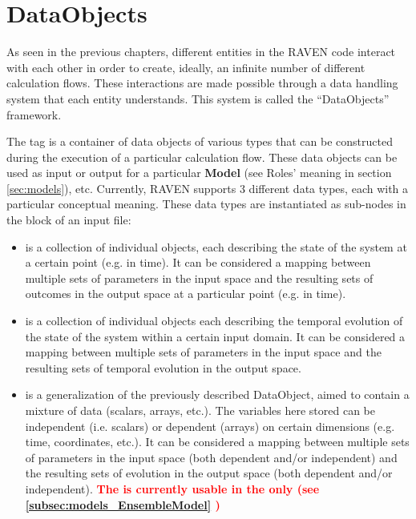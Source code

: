 \section{DataObjects}
\label{sec:DataObjects}

As seen in the previous chapters, different entities in the RAVEN
code interact with each other in order to create, ideally, an infinite number of
different calculation flows.
%
These interactions are made possible through a data handling system that each
entity understands.
%
This system is called the ``DataObjects'' framework.

The  tag is a container of data objects of various types that can
be constructed during the execution of a particular calculation flow.
%
These data objects can be used as input or output for a particular
\textbf{Model} (see Roles' meaning in section \ref{sec:models}), etc.
%
Currently, RAVEN supports 3 different data types, each with a particular
conceptual meaning.
%
These data types are instantiated as sub-nodes in the  block of
an input file:
\begin{itemize}
  \item {} is a collection of individual objects, each
  describing the state of the system at a certain point (e.g. in time).
  It can be considered a mapping between multiple sets of parameters in the
  input space and the resulting sets of outcomes in the output space at a
  particular point (e.g. in time).
  \item {} is a collection of individual objects each
  describing the temporal evolution of the state of the system within a certain
  input domain.
  It can be considered a mapping between multiple sets of parameters in the
  input space and the resulting sets of temporal evolution in the output
  space.
   \item {} is a generalization of the previously described DataObject, 
   aimed to contain a mixture of data (scalars, arrays, etc.). The variables here stored
   can be independent (i.e. scalars) or dependent (arrays) on certain dimensions (e.g. time, coordinates, etc.).
  It can be considered a mapping between multiple sets of parameters in the
  input space (both dependent and/or independent) and the resulting sets of evolution in the output
  space (both dependent and/or independent).
  \nb \textcolor{red} {\textbf{The   is currently usable in the   only (see \ref{subsec:models_EnsembleModel} )}}
\end{itemize}

